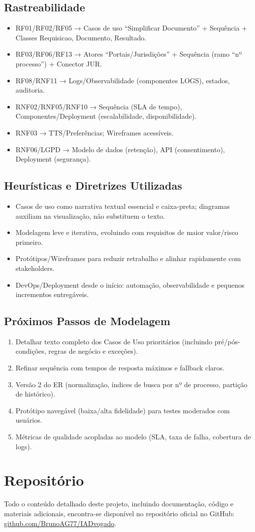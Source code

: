 \documentclass{article}
\begin{document}
\subsection{Rastreabilidade }
\begin{itemize}
    \item RF01/RF02/RF05 → Casos de uso “Simplificar Documento” + Sequência + Classes Requisicao, Documento, Resultado.
    \item RF03/RF06/RF13 → Atores “Portais/Jurisdições” + Sequência (ramo “nº processo”) + Conector JUR.
    \item RF08/RNF11 → Logs/Observabilidade (componentes LOGS), estados, auditoria.
    \item RNF02/RNF05/RNF10 → Sequência (SLA de tempo), Componentes/Deployment (escalabilidade, disponibilidade).
    \item RNF03 → TTS/Preferências; Wireframes acessíveis.
    \item RNF06/LGPD → Modelo de dados (retenção), API (consentimento), Deployment (segurança).
\end{itemize}

\subsection{Heurísticas e Diretrizes Utilizadas}
\begin{itemize}
    \item Casos de uso como narrativa textual essencial e caixa-preta; diagramas auxiliam na visualização, não substituem o texto.
    \item Modelagem leve e iterativa, evoluindo com requisitos de maior valor/risco primeiro.
    \item Protótipos/Wireframes para reduzir retrabalho e alinhar rapidamente com stakeholders.
    \item DevOps/Deployment desde o início: automação, observabilidade e pequenos incrementos entregáveis.
\end{itemize}

\newpage

\subsection{Próximos Passos de Modelagem}
\begin{enumerate}
    \item Detalhar texto completo dos Casos de Uso prioritários (incluindo pré/pós-condições, regras de negócio e exceções).
    \item Refinar sequência com tempos de resposta máximos e fallback claros.
    \item Versão 2 do ER (normalização, índices de busca por nº de processo, partição de histórico).
    \item Protótipo navegável (baixa/alta fidelidade) para testes moderados com usuários.
    \item Métricas de qualidade acopladas ao modelo (SLA, taxa de falha, cobertura de logs).
\end{enumerate}

\section{Repositório}
Todo o conteúdo detalhado deste projeto, incluindo documentação, código e materiais adicionais, encontra-se disponível no repositório oficial no GitHub: \href{https://github.com/BrunoAG77/IADvogado}{github.com/BrunoAG77/IADvogado}.
\end{document}
